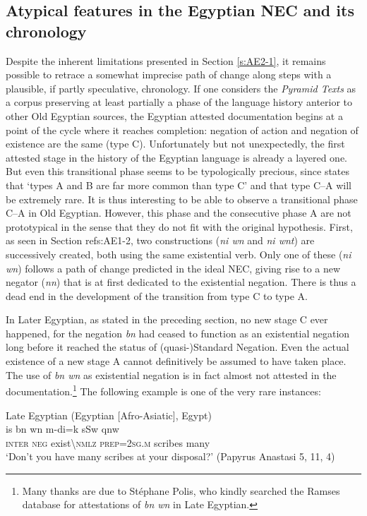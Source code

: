 \documentclass[output=paper]{langsci/langscibook}
\begin{document}
\subsection{Atypical features in the Egyptian NEC and its chronology}\label{s:AE3-3}

Despite the inherent limitations presented in Section \ref{s:AE2-1}, it remains possible to retrace a somewhat imprecise path of change along steps with a plausible, if partly speculative, chronology. If one considers the \emph{Pyramid Texts} as a corpus preserving at least partially a phase of the language history anterior to other Old Egyptian sources, the Egyptian attested documentation begins at a point of the cycle where it reaches completion: negation of action and negation of existence are the same (type C). Unfortunately but not unexpectedly, the first attested stage in the history of the Egyptian language is already a layered one. But even this transitional phase seems to be typologically precious, since \citet[18]{Croft1991} states that ‘types A and B are far more common than type C’ and that type C–A will be extremely rare. It is thus interesting to be able to observe a transitional phase C–A in Old Egyptian. However, this phase and the consecutive phase A are not prototypical in the sense that they do not fit with the original hypothesis. First, as seen in Section ref{s:AE1-2}, two constructions (\textit{ni wn} and \textit{ni wnt}) are successively created, both using the same existential verb. Only one of these (\textit{ni wn}) follows a path of change predicted in the ideal NEC, giving rise to a new negator (\textit{nn}) that is at first dedicated to the existential negation. There is thus a dead end in the development of the transition from type C to type A.  
 
In Later Egyptian, as stated in the preceding section, no new stage C ever happened, for the negation \textit{bn} had ceased to function as an existential negation long before it reached the status of (quasi-)Standard Negation. Even the actual existence of a new stage A cannot definitively be assumed to have taken place. The use of \textit{bn wn} as existential negation is in fact almost not attested in the documentation.\footnote{Many thanks are due to Stéphane Polis, who kindly searched the Ramses database for attestations of \textit{bn wn} in Late Egyptian.} 
The following example is one of the very rare instances:

\ea Late Egyptian (Egyptian [Afro-Asiatic], Egypt) \label{ex:AE51}\\
    \gll is bn wn m-di=k sSw qnw\\
    \textsc{inter} \textsc{neg} exist\textbackslash\textsc{nmlz} \textsc{prep=2sg.m} scribes many\\ 
    \glt ‘Don’t you have many scribes at your disposal?’ (Papyrus Anastasi 5, 11, 4)
\z 
\end{document}
